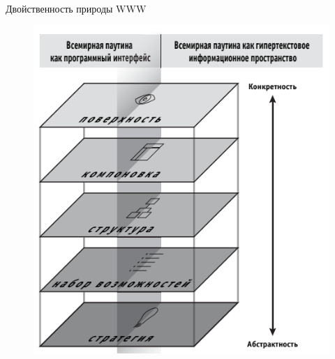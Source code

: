 \documentclass{beamer}
\begin{document}
\begin{frame}{Двойственность природы WWW}
\begin{figure}[h]
\centering
\includegraphics[scale=0.5]{images/lec01-pic11.png}
\end{figure}
\end{frame}
\end{document}
